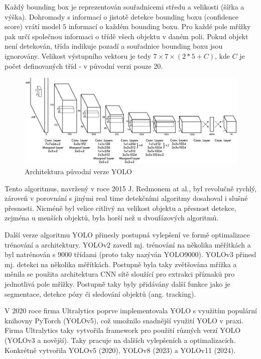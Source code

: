 Každý bounding box je reprezentován souřadnicemi středu a velikosti (šířka a
výška). Dohromady s informací o jistotě detekce bounding boxu (confidence
score) vrátí model $5$ informací o každém bounding boxu. Pro každé pole mřížky
pak určí společnou informaci o třídě všech objektu v daném poli. Pokud objekt
není detekován, třída indikuje pozadí a souřadnice bounding boxu jsou
ignorovány. Velikost výstupního vektoru je tedy $7 \times 7 \times (2 * 5 +
    C)$, kde $C$ je počet definovaných tříd - v původní verzi pouze 20.

\begin{figure}[]
    \centering
    \includegraphics[width=\textwidth]{Figures/yolo}
    \caption{Architektura původní verze YOLO \cite{yolo}}
    \label{fig:yolo}
\end{figure}

Tento algoritmus, navržený v roce 2015 J. Redmonem at al., byl revolučně
rychlý, zároveň v porovnání s jinými real time detekčními algoritmy dosahoval i
slušné přesnosti. Nicméně byl velice citlivý na velikost objektu a přesnost
detekce, zejména u menších objektů, byla horší než u dvoufázových algoritmů.

Další verze algoritmu YOLO přinesly postupná vylepšení ve formě optimalizace
trénování a architektury. YOLOv2 \cite{yolo9000} zavedl mj. trénování na
několika měřítkách a byl natrénován s 9000 třídami (proto taky nazýván
YOLO9000). YOLOv3 \cite{yolov3} přinesl mj. detekci na několika měřítkách.
Postupně byla taky zvětšována mřížka a měnila se použita architektura CNN sítě
sloužící pro extrakci příznaků pro jednotlivá pole mřížky. Postupně taky byly
přidávány další funkce jako je segmentace, detekce pózy či sledování objektů
(ang. tracking).

V 2020 roce firma Ultralytics poprve implementovala YOLO s využitím populární
knihovny PyTorch (YOLOv5), což umožnilo snadnější využití YOLO v praxi. Firma
Ultralytics taky vytvořila framework pro použití různých verzí YOLO (YOLOv3 a
novější). Taky pracuje na dalších vylepšeních a optimalizacích. Konkrétně
vytvořila YOLOv5 (2020), YOLOv8 (2023) a YOLOv11 (2024).

